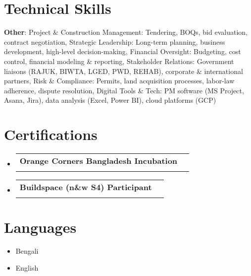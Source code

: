 \documentclass[letterpaper,11pt]{article}
\makeatletter
\newcommand{\resumeItem}[1]{
  \item\small{
    {#1 \vspace{-2pt}}
  }
}
\newcommand{\resumeSubheading}[4]{
  \vspace{-2pt}\item
    \begin{tabular*}{0.97\textwidth}[t]{l@{\extracolsep{\fill}}r}
      \textbf{#1} & #2 \\
      \textit{\small#3} & \textit{\small #4} \\
    \end{tabular*}\vspace{-7pt}
}
\newcommand{\resumeSubHeadingListStart}{\begin{itemize}[leftmargin=0.15in, label={}]}
\newcommand{\resumeSubHeadingListEnd}{\end{itemize}}
\newcommand{\resumeItemListStart}{\begin{itemize}}
\newcommand{\resumeItemListEnd}{\end{itemize}\vspace{-5pt}}
\makeatother
\begin{document}
\section{Technical Skills}
 \begin{itemize}[leftmargin=0.15in, label={}]
    \small{\item{
     \textbf{Other}: Project \& Construction Management: Tendering, BOQs, bid evaluation, contract negotiation, Strategic Leadership: Long-term planning, business development, high-level decision-making, Financial Oversight: Budgeting, cost control, financial modeling \& reporting, Stakeholder Relations: Government liaisons (RAJUK, BIWTA, LGED, PWD, REHAB), corporate \& international partners, Risk \& Compliance: Permits, land acquisition processes, labor-law adherence, dispute resolution, Digital Tools \& Tech: PM software (MS Project, Asana, Jira), data analysis (Excel, Power BI), cloud platforms (GCP)
    }}
 \end{itemize}

\section{Certifications}
  \resumeSubHeadingListStart
    \resumeSubheading
      {Orange Corners Bangladesh Incubation}{}
      {}{}
    \resumeSubheading
      {Buildspace (n\&w S4) Participant}{}
      {}{}
  \resumeSubHeadingListEnd

\section{Languages}
  \resumeItemListStart
    \resumeItem{Bengali}
    \resumeItem{English}
  \resumeItemListEnd

\end{document}
